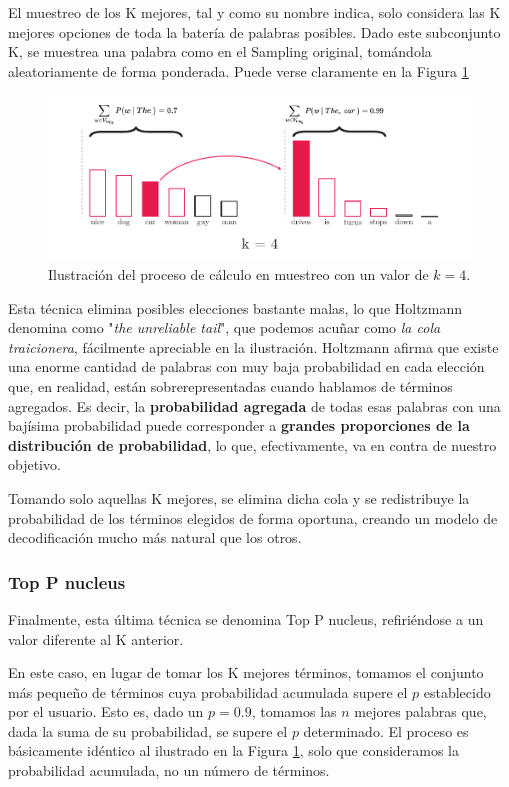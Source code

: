 El muestreo de los K mejores, tal y como su nombre indica, solo considera las K mejores opciones de toda la batería de palabras posibles. Dado este subconjunto K, se muestrea una palabra como en el Sampling original, tomándola aleatoriamente de forma ponderada. Puede verse claramente en la Figura \ref{fig:top-k} 


\begin{figure}[h]
	\centering
	\includegraphics[width=.9\textwidth]{media/top k.pdf}
	\caption{Ilustración del proceso de cálculo en muestreo con un valor de $k = 4$.}
	\label{fig:top-k}
\end{figure}

Esta técnica elimina posibles elecciones bastante malas, lo que Holtzmann denomina como "\textit{the unreliable tail}", que podemos acuñar como \textit{la cola traicionera}, fácilmente apreciable en la ilustración. Holtzmann afirma que existe una enorme cantidad de palabras con muy baja probabilidad en cada elección que, en realidad, están sobrerepresentadas cuando hablamos de términos agregados. Es decir, la \textbf{probabilidad agregada} de todas esas palabras con una bajísima probabilidad puede corresponder a \textbf{grandes proporciones de la distribución de probabilidad}, lo que, efectivamente, va en contra de nuestro objetivo.

Tomando solo aquellas K mejores, se elimina dicha cola y se redistribuye la probabilidad de los términos elegidos de forma oportuna, creando un modelo de decodificación mucho más natural que los otros.

\subsubsection{Top P nucleus}

Finalmente, esta última técnica se denomina Top P nucleus, refiriéndose a un valor diferente al K anterior.

En este caso, en lugar de tomar los K mejores términos, tomamos el conjunto más pequeño de términos cuya probabilidad acumulada supere el $p$ establecido por el usuario. Esto es, dado un $p = 0.9$, tomamos las $n$ mejores palabras que, dada la suma de su probabilidad, se supere el $p$ determinado. El proceso es básicamente idéntico al ilustrado en la Figura \ref{fig:top-k}, solo que consideramos la probabilidad acumulada, no un número de términos.


